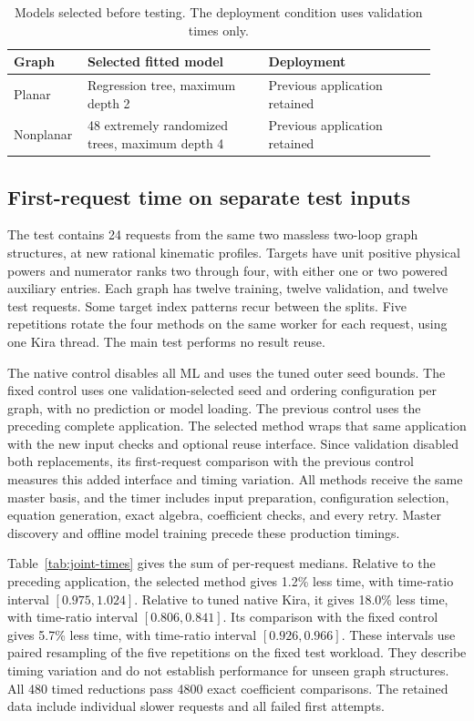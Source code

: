 \begin{table}[!htbp]\centering\small
\caption{Models selected before testing. The deployment condition uses validation times only.}
\label{tab:joint-models}
\begin{tabular}{@{}p{0.13\linewidth}p{0.41\linewidth}p{0.38\linewidth}@{}}\toprule
Graph & Selected fitted model & Deployment\\\midrule
Planar & Regression tree, maximum depth 2 & Previous application retained\\
Nonplanar & 48 extremely randomized trees, maximum depth 4 & Previous application retained\\
\bottomrule\end{tabular}\end{table}

\subsection{First-request time on separate test inputs}
The test contains 24 requests from the same two massless two-loop graph structures, at new rational kinematic profiles. Targets have unit positive physical powers and numerator ranks two through four, with either one or two powered auxiliary entries. Each graph has twelve training, twelve validation, and twelve test requests. Some target index patterns recur between the splits. Five repetitions rotate the four methods on the same worker for each request, using one Kira thread. The main test performs no result reuse.

The native control disables all ML and uses the tuned outer seed bounds. The fixed control uses one validation-selected seed and ordering configuration per graph, with no prediction or model loading. The previous control uses the preceding complete application. The selected method wraps that same application with the new input checks and optional reuse interface. Since validation disabled both replacements, its first-request comparison with the previous control measures this added interface and timing variation. All methods receive the same master basis, and the timer includes input preparation, configuration selection, equation generation, exact algebra, coefficient checks, and every retry. Master discovery and offline model training precede these production timings.

Table~\ref{tab:joint-times} gives the sum of per-request medians. Relative to the preceding application, the selected method gives 1.2\% less time, with time-ratio interval $[0.975,1.024]$. Relative to tuned native Kira, it gives 18.0\% less time, with time-ratio interval $[0.806,0.841]$. Its comparison with the fixed control gives 5.7\% less time, with time-ratio interval $[0.926,0.966]$. These intervals use paired resampling of the five repetitions on the fixed test workload. They describe timing variation and do not establish performance for unseen graph structures. All 480 timed reductions pass 4800 exact coefficient comparisons. The retained data include individual slower requests and all failed first attempts.


